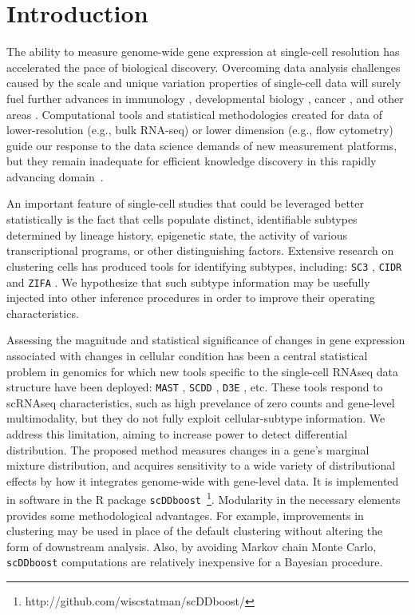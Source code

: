 \documentclass[aoas,preprint]{imsart}
\begin{document}
\begin{frontmatter}
\end{frontmatter}

\section{Introduction}

The ability to measure genome-wide gene expression at single-cell resolution 
has accelerated the pace of biological discovery.  Overcoming data
analysis challenges caused by the scale and unique variation properties of single-cell
data will surely fuel further advances in immunology \citep{immune}, developmental
biology \citep{dv}, cancer \citep{cancer}, and other areas \citep{scs}. 
 Computational tools and statistical methodologies 
created for data of lower-resolution (e.g., bulk RNA-seq) or lower dimension 
(e.g., flow cytometry)  guide our response to 
 the data science demands of new measurement platforms,
but they remain inadequate for efficient knowledge discovery in this
rapidly advancing domain~\citep{Bacher2016}.

An important feature of single-cell studies that could be leveraged better
statistically is the fact that cells populate distinct, identifiable subtypes
determined by lineage history, epigenetic state, the activity
of various transcriptional programs, or other 
distinguishing factors. Extensive research on clustering cells
has produced tools for identifying subtypes, including: 
 \verb+SC3+ \citep{sc3}, \verb+CIDR+ \citep{CIDR} and \verb+ZIFA+ \citep{ZIFA}.
We hypothesize that such
subtype information may be usefully injected into other inference procedures in order
to improve their operating characteristics. 

Assessing the magnitude and statistical significance of changes in gene
expression associated with changes in cellular condition has been a central
statistical problem in genomics for which new tools specific to
the single-cell RNAseq data structure have been deployed: \verb+MAST+ \citep{ref:MAST},
\verb+SCDD+ \citep{ref:scDD}, \verb+D3E+ \citep{ref:d3e}, etc.  These tools respond
to scRNAseq characteristics, such as high prevelance of zero counts and
gene-level multimodality, but they do not fully exploit cellular-subtype
information.  We address this limitation, aiming to increase power to detect differential distribution.
The proposed method measures changes in a gene's marginal mixture distribution, and
acquires sensitivity  to a wide variety of distributional effects by how it integrates genome-wide with
gene-level data.  It is implemented in  software 
in the R package \verb+scDDboost+~\footnote{http://github.com/wiscstatman/scDDboost/}.
Modularity in the necessary elements provides some methodological advantages. For example,
improvements in clustering may be used in place of the default clustering
without altering the form of downstream analysis.  Also, by avoiding Markov chain Monte Carlo,
\verb+scDDboost+ computations are relatively inexpensive for a Bayesian procedure.
\end{document}
